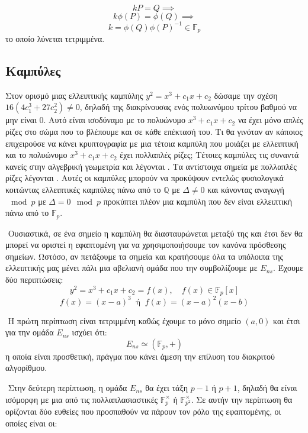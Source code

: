 \documentclass[oneside,a4paper]{article}
\begin{document}
$$k P = Q \implies $$
$$k \phi(P) = \phi(Q) \implies $$
$$k = \phi(Q) \phi(P)^{-1} \in \mathbb{F}_p$$ το οποίο λύνεται τετριμμένα.



\vspace*{0.3cm}
\subsection{ Καμπύλες}

\vspace*{0.3cm}
\noindent Στον ορισμό μιας ελλειπτικής καμπύλης $y^2 = x^3 + c_1 x +c_2$ δώσαμε την σχέση $16(4c_1^3 +27c_2^2)\neq 0$, δηλαδή της διακρίνουσας ενός πολυωνύμου τρίτου βαθμού να μην είναι $0$. Αυτό είναι ισοδύναμο με το πολυώνυμο $x^3 +c_1 x+c_2$ να έχει μόνο απλές ρίζες στο σώμα που το βλέπουμε και σε κάθε επέκτασή του. Τι θα γινόταν αν κάποιος επιχειρούσε να κάνει κρυπτογραφία με μια τέτοια καμπύλη που μοιάζει με ελλειπτική και το πολυώνυμο $x^3 + c_1x+c_2$ έχει πολλαπλές ρίζες; Τέτοιες καμπύλες τις συναντά κανείς στην αλγεβρική γεωμετρία και λέγονται . Τα αντίστοιχα σημεία με πολλαπλές ρίζες λέγονται . Αυτές οι καμπύλες μπορούν να προκύψουν εντελώς φυσιολογικά κοιτώντας ελλειπτικές καμπύλες πάνω από το $\mathbb{Q}$ με $\Delta \neq 0$ και κάνοντας αναγωγή $\mod p$ με $\Delta = 0 \mod p$ προκύπτει πλέον μια καμπύλη που δεν είναι ελλειπτική πάνω από το $\mathbb{F}_p$.

$ $\newline
Ουσιαστικά, σε ένα  σημείο η καμπύλη θα διασταυρώνεται μεταξύ της και έτσι δεν θα μπορεί να οριστεί η εφαπτομένη για να χρησιμοποιήσουμε τον κανόνα πρόσθεσης σημείων. Ωστόσο, αν πετάξουμε τα  σημεία και κρατήσουμε όλα τα υπόλοιπα της ελλειπτικής μας μένει πάλι μια αβελιανή ομάδα που την συμβολίζουμε με $E_{ns}$. Έχουμε δύο περιπτώσεις:
$$y^2 = x^3+c_1 x+c_2 = f(x), \quad f(x) \in \mathbb{F}_p[x]$$
$$f(x) = (x-a)^3 \ \text{ ή } \ f(x) = (x-a)^2(x-b)$$

$ $\newline
Η πρώτη περίπτωση είναι τετριμμένη καθώς έχουμε το μόνο  σημείο $(a,0)$ και έτσι για την ομάδα $E_{ns}$ ισχύει ότι:
$$E_{ns} \simeq (\mathbb{F}_p,+)$$ η οποία είναι προσθετική, πράγμα που κάνει άμεση την επίλυση του διακριτού αλγορίθμου.

$ $\newline
Στην δεύτερη περίπτωση, η ομάδα $E_{ns}$ θα έχει τάξη $p-1$ ή $p+1$, δηλαδή θα είναι ισόμορφη με μια από τις πολλαπλασιαστικές $\mathbb{F}_p^{\times}$ ή $\mathbb{F}_{p^2}^{\times}$. Σε αυτήν την περίπτωση θα ορίζονται δύο ευθείες που προσπαθούν να πάρουν τον ρόλο της εφαπτομένης, οι οποίες είναι οι:
\end{document}
